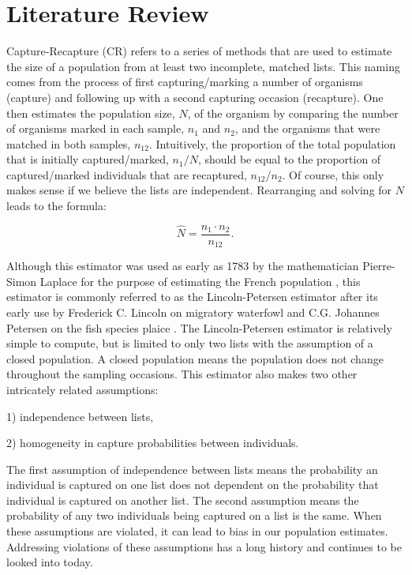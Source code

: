 \documentclass[
  12pt,
]{article}
\begin{document}
\newpage
\section{Literature Review}
\label{Sec:litreview}

Capture-Recapture (CR) refers to a series of methods that are used to
estimate the size of a population from at least two incomplete, matched
lists. This naming comes from the process of first capturing/marking a
number of organisms (capture) and following up with a second capturing
occasion (recapture). One then estimates the population size, \(N\), of
the organism by comparing the number of organisms marked in each sample,
\(n_1\) and \(n_2\), and the organisms that were matched in both
samples, \(n_{12}\). Intuitively, the proportion of the total population
that is initially captured/marked, \(n_1/N\), should be equal to the
proportion of captured/marked individuals that are recaptured,
\(n_{12}/n_2\). Of course, this only makes sense if we believe the lists
are independent. Rearranging and solving for \(N\) leads to the formula:

\[\hat{N} = \frac{n_1 \cdot n_2}{n_{12}}.  \]

Although this estimator was used as early as 1783 by the mathematician
Pierre-Simon Laplace for the purpose of estimating the French population
\citep{schaefer_estimation_1951}, this estimator is commonly referred to
as the Lincoln-Petersen estimator after its early use by Frederick C.
Lincoln on migratory waterfowl \citep{lincoln_calculating_1930} and C.G.
Johannes Petersen on the fish species plaice
\citep{petersen_yearly_1895}. The Lincoln-Petersen estimator is
relatively simple to compute, but is limited to only two lists with the
assumption of a closed population. A closed population means the
population does not change throughout the sampling occasions. This
estimator also makes two other intricately related assumptions:

\begin{list}{}{}

\item[1)] independence between lists,

\item[2)] homogeneity in capture probabilities between individuals.

\end{list}

The first assumption of independence between lists means the probability
an individual is captured on one list does not dependent on the
probability that individual is captured on another list. The second
assumption means the probability of any two individuals being captured
on a list is the same. When these assumptions are violated, it can lead
to bias in our population estimates. Addressing violations of these
assumptions has a long history and continues to be looked into today.
\end{document}
